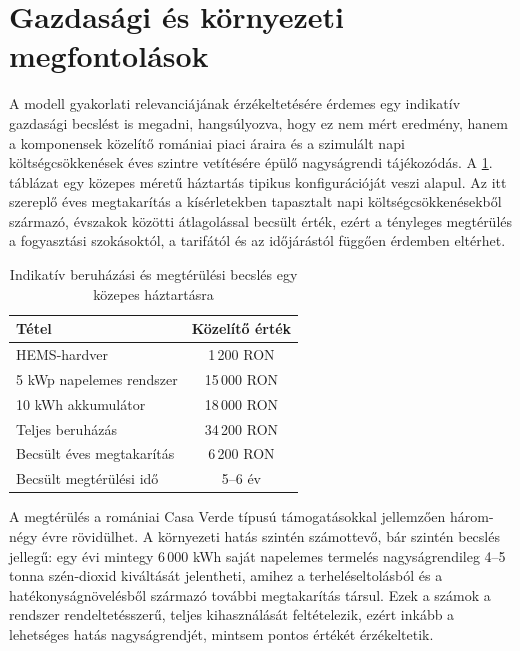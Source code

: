 \section{Gazdasági és környezeti megfontolások}
A modell gyakorlati relevanciájának érzékeltetésére érdemes egy indikatív gazdasági becslést is megadni, hangsúlyozva, hogy ez nem mért eredmény, hanem a komponensek közelítő romániai piaci áraira és a szimulált napi költségcsökkenések éves szintre vetítésére épülő nagyságrendi tájékozódás. A \ref{tab:gazdasagi}. táblázat egy közepes méretű háztartás tipikus konfigurációját veszi alapul. Az itt szereplő éves megtakarítás a kísérletekben tapasztalt napi költségcsökkenésekből származó, évszakok közötti átlagolással becsült érték, ezért a tényleges megtérülés a fogyasztási szokásoktól, a tarifától és az időjárástól függően érdemben eltérhet.

\begin{table}[H]
\centering
\caption{Indikatív beruházási és megtérülési becslés egy közepes háztartásra}
\label{tab:gazdasagi}
\begin{tabular}{lc}
\toprule
Tétel & Közelítő érték \\
\midrule
HEMS-hardver & 1\,200 RON \\
5 kWp napelemes rendszer & 15\,000 RON \\
10 kWh akkumulátor & 18\,000 RON \\
\midrule
Teljes beruházás & 34\,200 RON \\
Becsült éves megtakarítás & 6\,200 RON \\
Becsült megtérülési idő & 5--6 év \\
\bottomrule
\end{tabular}
\end{table}

A megtérülés a romániai Casa Verde típusú támogatásokkal jellemzően három-négy évre rövidülhet. A környezeti hatás szintén számottevő, bár szintén becslés jellegű: egy évi mintegy 6\,000 kWh saját napelemes termelés nagyságrendileg 4--5 tonna szén-dioxid kiváltását jelentheti, amihez a terheléseltolásból és a hatékonyságnövelésből származó további megtakarítás társul. Ezek a számok a rendszer rendeltetésszerű, teljes kihasználását feltételezik, ezért inkább a lehetséges hatás nagyságrendjét, mintsem pontos értékét érzékeltetik.

